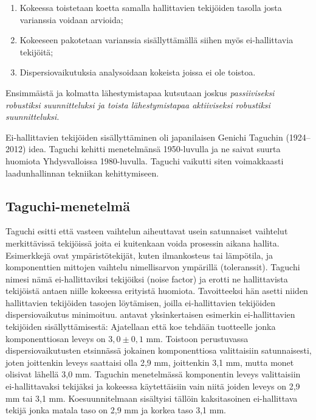 \documentclass[12pt,a4paper,finnish]{tutthesis}
\begin{document}
\begin{enumerate}
\item  Kokeessa toistetaan koetta samalla hallittavien tekijöiden
    tasolla josta varianssia voidaan arvioida;
\item Kokeeseen pakotetaan varianssia sisällyttämällä siihen
    myös ei-hallittavia tekijöitä;
\item Dispersiovaikutuksia analysoidaan kokeista joissa ei
    ole toistoa. \parencite{Bursztyn}
\end{enumerate}

Ensimmäistä ja kolmatta lähestymistapaa kutsutaan joskus
\em passiiviseksi \em robustiksi suunnitteluksi ja toista lähestymistapaa
\em aktiiviseksi \em robustiksi suunnitteluksi.

Ei-hallittavien tekijöiden sisällyttäminen oli japanilaisen
Genichi Taguchin (1924--2012) idea. Taguchi kehitti menetelmänsä
1950-luvulla ja ne saivat suurta huomiota Yhdysvalloissa 1980-luvulla.
Taguchi vaikutti siten voimakkaasti laadunhallinnan tekniikan kehittymiseen.

\subsection{Taguchi-menetelmä}

Taguchi esitti että vasteen vaihtelun aiheuttavat usein satunnaiset vaihtelut
merkittävissä tekijöissä joita ei kuitenkaan voida prosessin aikana hallita.
Esimerkkejä ovat ympäristötekijät, kuten ilmankosteus tai lämpötila, ja
komponenttien mittojen vaihtelu nimellisarvon ympärillä (toleranssit).
Taguchi nimesi nämä ei-hallittaviksi tekijöiksi (noise factor)
ja erotti ne hallittavista tekijöistä antaen niille kokeessa erityistä
huomiota. Tavoitteeksi hän asetti niiden hallittavien tekijöiden tasojen
löytämisen, joilla ei-hallittavien tekijöiden dispersiovaikutus minimoituu.
\textcite{Bursztyn} antavat yksinkertaisen esimerkin ei-hallittavien tekijöiden
sisällyttämisestä: Ajatellaan että koe tehdään tuotteelle jonka
komponenttiosan leveys on \(3,0 \pm 0,1\) mm.
Toistoon perustuvassa dispersiovaikutusten etsinnässä jokainen
komponenttiosa valittaisiin satunnaisesti, joten joittenkin leveys
saattaisi olla 2,9 mm, joittenkin 3,1 mm, mutta monet olisivat lähellä
3,0 mm. Taguchin menetelmässä komponentin leveys valittaisiin
ei-hallittavaksi tekijäksi ja kokeessa käytettäisiin vain niitä joiden
leveys on 2,9 mm tai 3,1 mm. Koesuunnitelmaan sisältyisi tällöin
kaksitasoinen ei-hallittava tekijä jonka matala taso on 2,9 mm ja
korkea taso 3,1 mm.
\end{document}
